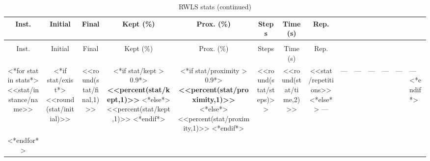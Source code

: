 \begin{longtable}{@{\extracolsep{5pt}}cccccccc}
	\caption{RWLS stats}\\
	\toprule
	Inst. & Initial & Final & Kept (\%) & Prox. (\%) & Steps & Time (s) & Rep.\\
	\midrule
	\endfirsthead
	\caption[]{RWLS stats (continued)}\\
	\toprule
	Inst. & Initial & Final & Kept (\%) & Prox. (\%) & Steps & Time (s) & Rep.\\
	\midrule
	\endhead
	\bottomrule
	\endfoot
<*for stat in stats*>
	<<stat/instance/name>> &
	<*if stat/exist*>
		<<round(stat/initial)>> & <<round(stat/final,1)>> &
		<*if stat/kept > 0.9*>
			\textbf{<<percent(stat/kept,1)>>}
		<*else*>
			<<percent(stat/kept,1)>>
		<*endif*>
		&
		<*if stat/proximity > 0.9*>
			\textbf{<<percent(stat/proximity,1)>>}
		<*else*>
			<<percent(stat/proximity,1)>>
		<*endif*>
		& <<round(stat/steps)>> & <<round(stat/time,2)>> & <<stat/repetitions>>
	<*else*>
		--- & --- & --- & --- & --- & --- & ---
	<*endif*>
	\\
<*endfor*>
\end{longtable}
